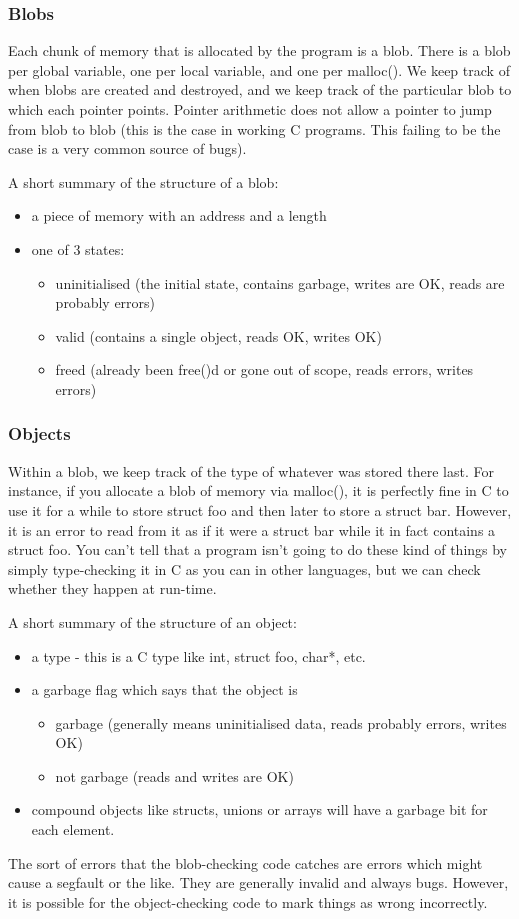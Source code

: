 \documentclass[a4paper]{report}
\begin{document}
\subsubsection{Blobs}
Each chunk of memory that is allocated by the program is a blob. There is a blob per global variable, one per local variable, and one per malloc(). We keep track of when blobs are created and destroyed, and we keep track of the particular blob to which each pointer points. Pointer arithmetic does not allow a pointer to jump from blob to blob (this is the case in working C programs. This failing to be the case is a very common source of bugs).
\par
A short summary of the structure of a blob:
\begin{itemize}
\item a piece of memory with an address and a length
\item one of 3 states:
  \begin{itemize}
  \item uninitialised (the initial state, contains garbage, writes are OK, reads are probably errors)
  \item valid (contains a single object, reads OK, writes OK)
  \item freed (already been free()d or gone out of scope, reads errors, writes errors) 
  \end{itemize}
\end{itemize}
\subsubsection{Objects}
Within a blob, we keep track of the type of whatever was stored there last. For instance, if you allocate a blob of memory via malloc(), it is perfectly fine in C to use it for a while to store struct foo and then later to store a struct bar. However, it is an error to read from it as if it were a struct bar while it in fact contains a struct foo. You can't tell that a program isn't going to do these kind of things by simply type-checking it in C as you can in other languages, but we can check whether they happen at run-time. 
\par
A short summary of the structure of an object:
\begin{itemize}
\item a type - this is a C type like int, struct foo, char*, etc. 
\item a garbage flag which says that the object is
  \begin{itemize}
  \item garbage (generally means uninitialised data, reads probably errors, writes OK) 
  \item not garbage (reads and writes are OK) 
  \end{itemize}
\item compound objects like structs, unions or arrays will have a garbage bit for each element. 
\end{itemize}
The sort of errors that the blob-checking code catches are errors which might cause a segfault or the like. They are generally invalid and always bugs. However, it is possible for the object-checking code to mark things as wrong incorrectly.
\par
\end{document}

